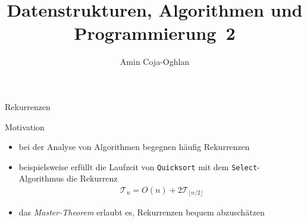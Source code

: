 \documentclass[aspectratio=1610, 11pt]{beamer}
\title{Datenstrukturen, Algorithmen und Programmierung~2}
\author[A.~Coja-Oghlan]{Amin Coja-Oghlan}
\institute[DAP2]{Lehrstuhl Informatik 2\\Fakult\"at f\"ur Informatik}
\newcommand\cT{\mathcal T}
\begin{document}
\maketitle

\begin{frame}{Rekurrenzen}
	\begin{exampleblock}{Motivation}
		\begin{itemize}
			\item bei der Analyse von Algorithmen begegnen h\"aufig Rekurrenzen
			\item beispielsweise erf\"ullt die Laufzeit von {\tt Quicksort} mit dem {\tt Select}-Algorithmus die Rekurrenz
				\begin{align*}
					\cT_n=O(n)+2\cT_{\lfloor n/2\rfloor}
				\end{align*}
			\item das {\em Master-Theorem} erlaubt es, Rekurrenzen bequem abzusch\"atzen
		\end{itemize}
	\end{exampleblock}
\end{frame}
\end{document}
